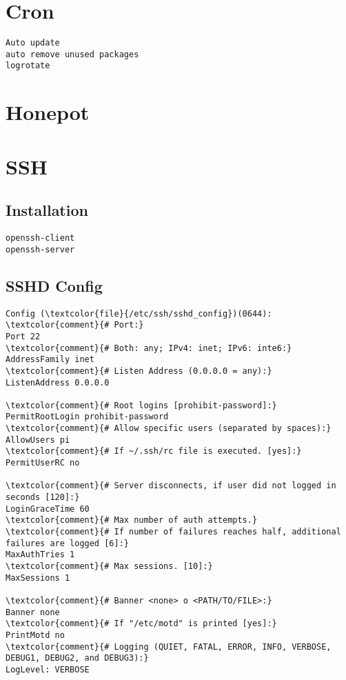 \documentclass[10pt, a4paper, onecolumn, openany]{book} %
\begin{document}
\section{Cron}
\begin{Verbatim}[commandchars=\\\{\}]
Auto update
auto remove unused packages
logrotate
\end{Verbatim}

\section{Honepot}

\section{SSH}
\subsection{Installation}
\begin{Verbatim}[commandchars=\\\{\}]
openssh-client
openssh-server
\end{Verbatim}

\subsection{SSHD Config}
\begin{Verbatim}[commandchars=\\\{\}]
Config (\textcolor{file}{/etc/ssh/sshd_config})(0644):
\textcolor{comment}{# Port:}
Port 22
\textcolor{comment}{# Both: any; IPv4: inet; IPv6: inte6:}
AddressFamily inet
\textcolor{comment}{# Listen Address (0.0.0.0 = any):}
ListenAddress 0.0.0.0

\textcolor{comment}{# Root logins [prohibit-password]:}
PermitRootLogin prohibit-password
\textcolor{comment}{# Allow specific users (separated by spaces):}
AllowUsers pi
\textcolor{comment}{# If ~/.ssh/rc file is executed. [yes]:}
PermitUserRC no

\textcolor{comment}{# Server disconnects, if user did not logged in seconds [120]:}
LoginGraceTime 60
\textcolor{comment}{# Max number of auth attempts.}
\textcolor{comment}{# If number of failures reaches half, additional failures are logged [6]:}
MaxAuthTries 1
\textcolor{comment}{# Max sessions. [10]:}
MaxSessions 1

\textcolor{comment}{# Banner <none> o <PATH/TO/FILE>:}
Banner none
\textcolor{comment}{# If "/etc/motd" is printed [yes]:}
PrintMotd no
\textcolor{comment}{# Logging (QUIET, FATAL, ERROR, INFO, VERBOSE, DEBUG1, DEBUG2, and DEBUG3):}
LogLevel: VERBOSE
\end{Verbatim}
\end{document}

